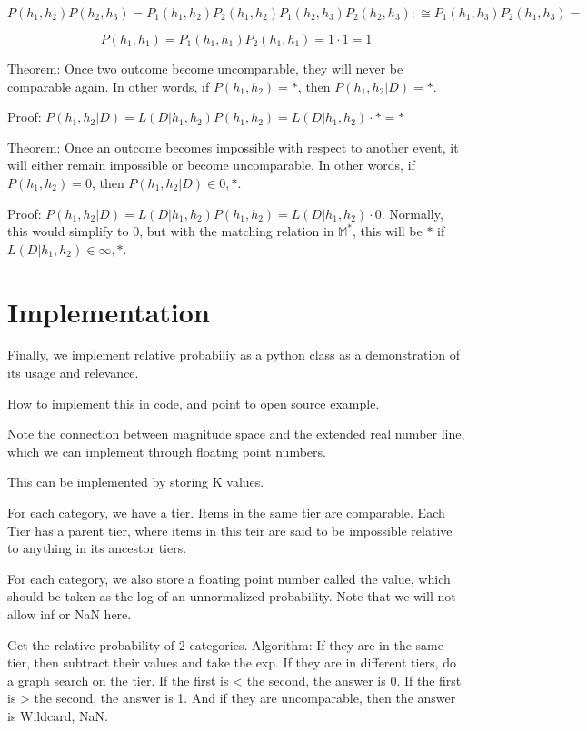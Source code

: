 \documentclass[twoside]{article}
\begin{document}
 \[P(h_1, h_2)P(h_2, h_3)=P_1(h_1, h_2) P_2(h_1, h_2)P_1(h_2, h_3) P_2(h_2, h_3) :\cong P_1(h_1, h_3) P_2(h_1, h_3)=\]

\[P(h_1, h_1) = P_1(h_1, h_1) P_2(h_1, h_1)=1 \cdot 1=1\]

Theorem: Once two outcome become uncomparable, they will never be comparable again. In other words, if \(P(h_1, h_2)=\ast\), then \(P(h_1, h_2|D) = \ast\).

Proof: \(P(h_1, h_2|D) = L(D|h_1, h_2) P(h_1, h_2) = L(D|h_1, h_2) \cdot \ast = \ast\)

Theorem: Once an outcome becomes impossible with respect to another event, it will either remain impossible or become uncomparable. In other words,  if \(P(h_1, h_2)=0\), then \(P(h_1, h_2|D) \in {0, \ast}\).

Proof: \(P(h_1, h_2|D) = L(D|h_1, h_2) P(h_1, h_2) = L(D|h_1, h_2) \cdot 0\). Normally, this would simplify to 0, but with the matching relation in \(\mathbb{M}^*\), this will be \(\ast\) if \(L(D|h_1, h_2) \in {\infty, \ast}\).

\section{Implementation}

Finally, we implement relative probabiliy as a python class as a demonstration of its usage and relevance.

How to implement this in code, and point to open source example.

Note the connection between magnitude space and the extended real number line, which we can implement through floating point numbers.

This can be implemented by storing K values.

For each category, we have a tier. Items in the same tier are comparable. Each Tier has a parent tier, where items in this teir are said to be impossible relative to anything in its ancestor tiers.

For each category, we also store a floating point number called the value, which should be taken as the log of an unnormalized probability. Note that we will not allow inf or NaN here.

Get the relative probability of 2 categories. Algorithm: If they are in the same tier, then subtract their values and take the exp. If they are in different tiers, do a graph search on the tier. If the first is < the second, the answer is 0. If the first is > the second, the answer is 1. And if they are uncomparable, then the answer is Wildcard, NaN.
\end{document}
